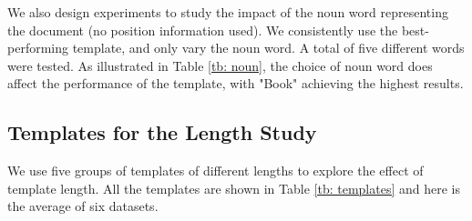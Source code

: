 \documentclass[11pt]{article}
\begin{document}
We also design experiments to study the impact of the noun word representing the document (no position information used). We consistently use the best-performing template, and only vary the noun word. A total of five different words were tested. As illustrated in Table \ref{tb: noun}, the choice of noun word does affect the performance of the template, with "Book" achieving the highest results.

\subsection{Templates for the Length Study}
\label{app: length}
\noindent We use five groups of templates of different lengths to explore the effect of template length. All the templates are shown in Table \ref{tb: templates} and  here is the average of six datasets.
\end{document}
